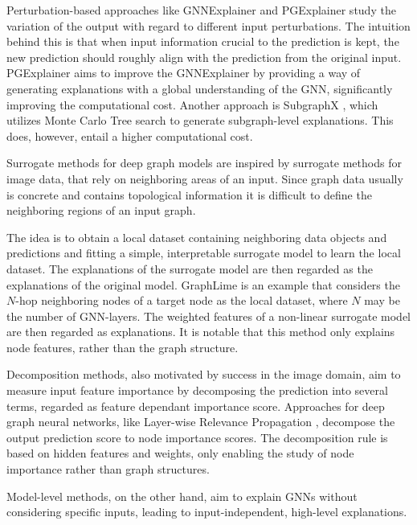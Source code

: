 Perturbation-based approaches like GNNExplainer \cite{ying2019gnnexplainer} and PGExplainer \cite{luo2020parameterized} study the variation of the output with regard to different input perturbations. The intuition behind this is that when input information crucial to the prediction is kept, the new prediction should roughly align with the prediction from the original input. PGExplainer aims to improve the GNNExplainer by providing a way of generating explanations with a global understanding of the GNN, significantly improving the computational cost. Another approach is SubgraphX \cite{yuan2021explainability}, which utilizes Monte Carlo Tree search to generate subgraph-level explanations. This does, however, entail a higher computational cost. 

Surrogate methods for deep graph models are inspired by surrogate methods for image data, that rely on neighboring areas of an input. Since graph data usually is concrete and contains topological information it is difficult to define the neighboring regions of an input graph.

The idea is to obtain a local dataset containing neighboring data objects and predictions and fitting a simple, interpretable surrogate model to learn the local dataset. The explanations of the surrogate model are then regarded as the explanations of the original model. GraphLime \cite{huang2022graphlime} is an example that considers the $N$-hop neighboring nodes of a target node as the local dataset, where $N$ may be the number of GNN-layers. The weighted features of a non-linear surrogate model are then regarded as explanations. It is notable that this method only explains node features, rather than the graph structure.

Decomposition methods, also motivated by success in the image domain, aim to measure input feature importance by decomposing the prediction into several terms, regarded as feature dependant importance score. Approaches for deep graph neural networks, like Layer-wise Relevance Propagation \cite{baldassarre2019explainability}, decompose the output prediction score to node importance scores. The decomposition rule is based on hidden features and weights, only enabling the study of node importance rather than graph structures.

Model-level methods, on the other hand, aim to explain GNNs without considering specific inputs, leading to input-independent, high-level explanations. \bigskip



